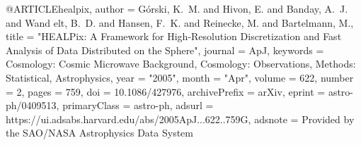 @ARTICLE{healpix,
       author = {{G{\'o}rski}, K.~M. and {Hivon}, E. and {Banday}, A.~J. and {Wand
        elt}, B.~D. and {Hansen}, F.~K. and {Reinecke}, M. and {Bartelmann}, M.},
        title = "{HEALPix: A Framework for High-Resolution Discretization and Fast Analysis of Data Distributed on the Sphere}",
      journal = {ApJ},
     keywords = {Cosmology: Cosmic Microwave Background, Cosmology: Observations, Methods: Statistical, Astrophysics},
         year = "2005",
        month = "Apr",
       volume = {622},
       number = {2},
        pages = {759},
          doi = {10.1086/427976},
archivePrefix = {arXiv},
       eprint = {astro-ph/0409513},
 primaryClass = {astro-ph},
       adsurl = {https://ui.adsabs.harvard.edu/abs/2005ApJ...622..759G},
      adsnote = {Provided by the SAO/NASA Astrophysics Data System}
}
